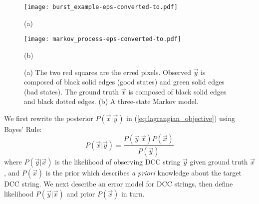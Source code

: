 \begin{figure}[tb]

\begin{minipage}[b]{.48\linewidth}
  \centering
  \centerline{\texttt{[image: burst\_example-eps-converted-to.pdf]}}
  \centerline{(a)}\medskip
\end{minipage}
\hfill
\begin{minipage}[b]{0.48\linewidth}
  \centering
  \centerline{\texttt{[image: markov\_process-eps-converted-to.pdf]}}
  \centerline{(b)}\medskip
\end{minipage}

\vspace{-0.2cm}
\caption{{(a) The two red squares are the erred pixels. Observed $\vec{y}$ is composed of black solid edges (good states) and green solid edges (bad states). The ground truth $\vec{x}$ is composed of black solid edges and black dotted edges. (b) A three-state Markov model.}}
\label{fig:burst_example}
\end{figure}


We first rewrite the posterior $P(\vec{x} | \vec{y})$ in (\ref{eq:lagrangian_objective}) using Bayes' Rule: 
\begin{equation}
P(\vec{x}|\vec{y}) = \frac{P(\vec{y}|\vec{x}) P(\vec{x})}{P(\vec{y})}
\end{equation}
where $P(\vec{y}|\vec{x})$ is the likelihood of observing DCC string $\vec{y}$ given ground truth $\vec{x}$, and $P(\vec{x})$ is the prior which describes \textit{a priori} knowledge about the target DCC string.
We next describe an error model for DCC strings, then define likelihood $P(\vec{y} | \vec{x})$ and prior $P(\vec{x})$ in turn.


%
%
%
%
%
%
%
%


